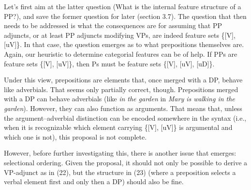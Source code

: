 \documentclass[output=paper
,modfonts
,nonflat]{langsci/langscibook}
\begin{document}
Let’s first aim at the latter question (What is the internal feature structure of a PP?), and save the former question for later (section 3.7). The question that then needs to be addressed is what the consequences are for assuming that PP adjuncts, or at least PP adjuncts modifying VPs, are indeed feature sets \{[V], [uV]\}. In that case, the question emerges as to what prepositions themselves are. Again, our heuristic to determine categorial features can be of help. If PPs are feature sets \{[V], [uV]\}, then Ps must be feature sets \{[V], [uV], [uD]\}.

\begin{figure}[!h]
	\begin{exe}
	\end{exe}
\end{figure} 
\noindent Under this view, prepositions are elements that, once merged with a DP, behave like adverbials. That seems only partially correct, though. Prepositions merged with a DP can behave adverbials (like \textit{in the garden} in \textit{Mary is walking in the garden}). However, they can also function as arguments. That means that, unless the argument–adverbial distinction can be encoded somewhere in the syntax (i.e., when it is recognizable which element carrying \{[V], [uV]\} is argumental and which one is not), this proposal is not complete. 

However, before further investigating this, there is another issue that emerges: selectional ordering. Given the proposal, it should not only be possible to derive a VP-adjunct as in (22), but the structure in (23) (where a preposition selects a verbal element first and only then a DP) should also be fine.
\end{document}
